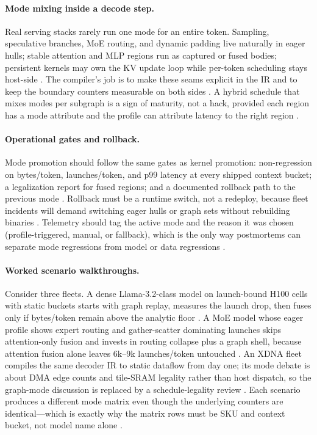 \paragraph{Mode mixing inside a decode step.}
Real serving stacks rarely run one mode for an entire token. Sampling, speculative branches, MoE routing, and dynamic padding live naturally in eager hulls; stable attention and MLP regions run as captured or fused bodies; persistent kernels may own the KV update loop while per-token scheduling stays host-side \citep{nvidia2024cudagraphs,kwon2023vllm,liu2024deepseekv3}. The compiler's job is to make these seams explicit in the IR and to keep the boundary counters measurable on both sides \citep{yirage2026,chen2020compilerbasedhardw}. A hybrid schedule that mixes modes per subgraph is a sign of maturity, not a hack, provided each region has a mode attribute and the profile can attribute latency to the right region \citep{taxbreak2026,patel2025llminference,memoryfloor2026}.

\paragraph{Operational gates and rollback.}
Mode promotion should follow the same gates as kernel promotion: non-regression on bytes/token, launches/token, and p99 latency at every shipped context bucket; a legalization report for fused regions; and a documented rollback path to the previous mode \citep{taxbreak2026,memoryfloor2026,yirage2026}. Rollback must be a runtime switch, not a redeploy, because fleet incidents will demand switching eager hulls or graph sets without rebuilding binaries \citep{patel2025llminference,nvidia2024cudagraphs,chen2020compilerbasedhardw}. Telemetry should tag the active mode and the reason it was chosen (profile-triggered, manual, or fallback), which is the only way postmortems can separate mode regressions from model or data regressions \citep{kwon2023vllm,memoryfloor2026}.

\paragraph{Worked scenario walkthroughs.}
Consider three fleets. A dense Llama-3.2-class model on launch-bound H100 cells with static buckets starts with graph replay, measures the launch drop, then fuses only if bytes/token remain above the analytic floor \citep{taxbreak2026,memoryfloor2026}. A MoE model whose eager profile shows expert routing and gather-scatter dominating launches skips attention-only fusion and invests in routing collapse plus a graph shell, because attention fusion alone leaves 6k--9k launches/token untouched \citep{taxbreak2026,liu2024deepseekv3}. An XDNA fleet compiles the same decoder IR to static dataflow from day one; its mode debate is about DMA edge counts and tile-SRAM legality rather than host dispatch, so the graph-mode discussion is replaced by a schedule-legality review \citep{amd2024xdna,amd2024aie,yirage2026}. Each scenario produces a different mode matrix even though the underlying counters are identical---which is exactly why the matrix rows must be SKU and context bucket, not model name alone \citep{patel2025llminference,memoryfloor2026}.

